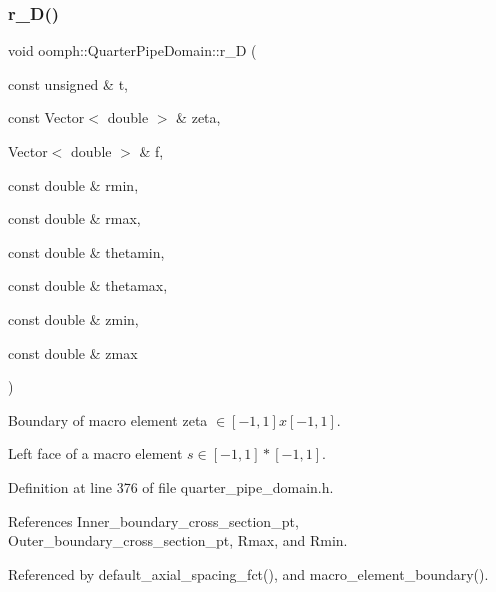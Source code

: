 \subsubsection{\texorpdfstring{r\+\_\+\+D()}{r\_D()}}
{\footnotesize\ttfamily void oomph\+::\+Quarter\+Pipe\+Domain\+::r\+\_\+D (\begin{DoxyParamCaption}\item[{const unsigned \&}]{t,  }\item[{const Vector$<$ double $>$ \&}]{zeta,  }\item[{Vector$<$ double $>$ \&}]{f,  }\item[{const double \&}]{rmin,  }\item[{const double \&}]{rmax,  }\item[{const double \&}]{thetamin,  }\item[{const double \&}]{thetamax,  }\item[{const double \&}]{zmin,  }\item[{const double \&}]{zmax }\end{DoxyParamCaption})\hspace{0.3cm}{\ttfamily [private]}}



Boundary of macro element zeta $ \in [-1,1]x[-1,1] $. 

Left face of a macro element $s \in [-1,1]*[-1,1] $. 

Definition at line 376 of file quarter\+\_\+pipe\+\_\+domain.\+h.



References Inner\+\_\+boundary\+\_\+cross\+\_\+section\+\_\+pt, Outer\+\_\+boundary\+\_\+cross\+\_\+section\+\_\+pt, Rmax, and Rmin.



Referenced by default\+\_\+axial\+\_\+spacing\+\_\+fct(), and macro\+\_\+element\+\_\+boundary().

\mbox{\label{classoomph_1_1QuarterPipeDomain_a85aaa5d1217c49e2144bbfd37dbad0fd}} 

